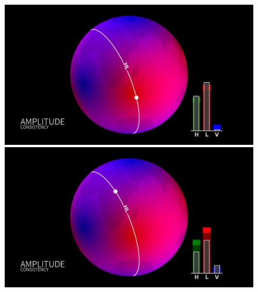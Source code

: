 \begin{figure}
\begin{minipage}{0.45\linewidth}
  \end{minipage}
  \hfill
  \begin{minipage}{0.45\linewidth}
    \centering
    \includegraphics[width=\linewidth]{sectionDetection/antenna-patterns_LeoSinger/00559.jpg}
  \end{minipage}
  \hfill
  \begin{minipage}{0.45\linewidth}
    \centering
    \includegraphics[width=\linewidth]{sectionDetection/antenna-patterns_LeoSinger/00584.jpg}
  \end{minipage}
  \hfill
  \centering
  \begin{minipage}{0.45\linewidth}
    \centering

\end{minipage}
\end{figure}
